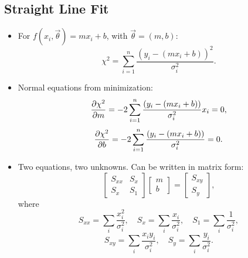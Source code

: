 \subsection{Straight Line Fit}
\begin{itemize}
    \item For $f(x_i, \vec{\theta}) = m x_i + b$, with $\vec{\theta} = (m, b)$:
          \[
              \chi^2 = \sum_{i=1}^{n} \frac{(y_i - (m x_i + b))^2}{\sigma_i^2}.
          \]
    \item Normal equations from minimization:
          \[
              \pdv{\chi^2}{m} = -2 \sum_{i=1}^{n} \frac{(y_i - (m x_i + b))}{\sigma_i^2} x_i = 0,
          \]
          \[
              \pdv{\chi^2}{b} = -2 \sum_{i=1}^{n} \frac{(y_i - (m x_i + b))}{\sigma_i^2} = 0.
          \]
    \item Two equations, two unknowns. Can be written in matrix form:
          \[
              \begin{bmatrix}
                  S_{xx} & S_x \\
                  S_x    & S_1
              \end{bmatrix}
              \begin{bmatrix}
                  m \\
                  b
              \end{bmatrix}
              =
              \begin{bmatrix}
                  S_{xy} \\
                  S_y
              \end{bmatrix},
          \]
          where
          \[
              S_{xx} = \sum_i \frac{x_i^2}{\sigma_i^2}, \quad
              S_x = \sum_i \frac{x_i}{\sigma_i^2}, \quad
              S_1 = \sum_i \frac{1}{\sigma_i^2},
          \]
          \[
              S_{xy} = \sum_i \frac{x_i y_i}{\sigma_i^2}, \quad
              S_y = \sum_i \frac{y_i}{\sigma_i^2}.
          \]
\end{itemize}

